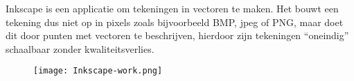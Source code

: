 Inkscape is een applicatie om tekeningen in vectoren te maken. Het bouwt een tekening dus niet op in pixels zoals bijvoorbeeld BMP, jpeg of PNG, maar doet dit door punten met vectoren te beschrijven, hierdoor zijn tekeningen ``oneindig'' schaalbaar zonder kwaliteitsverlies.
\begin{figure}[H]
\texttt{[image: Inkscape-work.png]}
\end{figure}


